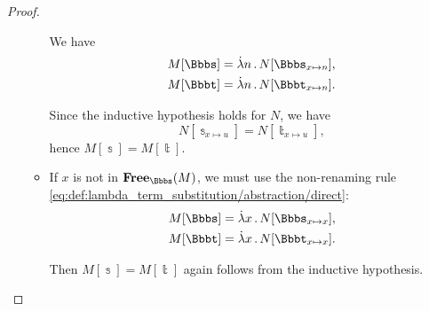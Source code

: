 \begin{proof}
\begin{itemize}
\begin{itemize}
      We have
      \begin{align*}
        M[\Bbbs] &= \qabs n N[\Bbbs_{x \mapsto n}], \\
        M[\Bbbt] &= \qabs n N[\Bbbt_{x \mapsto n}].
      \end{align*}

      Since the inductive hypothesis holds for \( N \), we have
      \begin{equation*}
        N[\Bbbs_{x \mapsto u}] = N[\Bbbt_{x \mapsto u}],
      \end{equation*}
      hence \( M[\Bbbs] = M[\Bbbt] \).

      \item If \( x \) is not in \( \op*{Free}_\Bbbs(M) \), we must use the non-renaming rule \eqref{eq:def:lambda_term_substitution/abstraction/direct}:
      \begin{align*}
        M[\Bbbs] &= \qabs x N[\Bbbs_{x \mapsto x}], \\
        M[\Bbbt] &= \qabs x N[\Bbbt_{x \mapsto x}].
      \end{align*}

      Then \( M[\Bbbs] = M[\Bbbt] \) again follows from the inductive hypothesis.
    \end{itemize}
  \end{itemize}
\end{proof}

